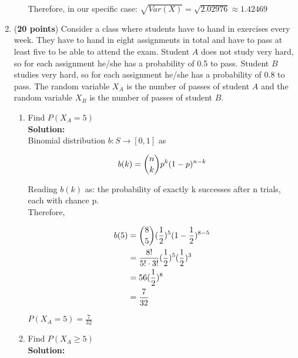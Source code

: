 \documentclass[a4paper]{article}
\begin{document}
\begin{enumerate}
\begin{enumerate}
Therefore, in our specific case: $\sqrt{Var(X)} = \sqrt{2.02976} \approx 1.42469$\\


	
	
\end{enumerate}



\item (\textbf{20 points}) Consider a class where students have to hand in exercises every week. They have to hand in eight assignments in total and have to pass at least five to be able to attend the exam. Student $A$ does not study very hard, so for each assignment he/she has a probability of 0.5 to pass. Student $B$ studies very hard, so for each assignment he/she has a probability of 0.8 to pass. The random variable $X_A$ is the number of passes of student $A$ and the random variable $X_B$ is the number of passes of student $B$.


\begin{enumerate}
	\item Find $P(X_A = 5)$\\
	\textbf{Solution:}\\
	
Binomial distribution $b : S \rightarrow [0,1]$ as

\begin{align}
	b(k) = {n \choose k}p^k(1-p)^{n-k}\notag
\end{align}
	
Reading $b(k)$ as: the probability of exactly k successes after n trials, each with chance p.\\


Therefore,

\begin{align}
	b(5) &= {8 \choose 5}(\frac{1}{2})^5(1 - \frac{1}{2})^{8 - 5}\notag\\
	&= \frac{8!}{5! \cdot 3!}(\frac{1}{2})^5(\frac{1}{2})^3\notag\\
	&= 56 (\frac{1}{2})^8\notag\\
	&= \frac{7}{32}\notag
\end{align}
	
$P(X_A = 5) = \frac{7}{32}$\\
	
	\item Find $P(X_A \geq 5)$\\
	\textbf{Solution:}\\
	

\end{enumerate}
\end{enumerate}
\end{document}
